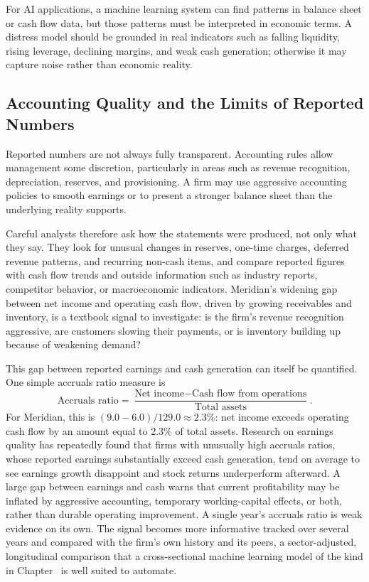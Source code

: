 \documentclass[../ai_in_finance]{subfiles}
\begin{document}
For AI applications, a machine learning system can find patterns in balance sheet or cash flow data, but those patterns must be interpreted in economic terms. A distress model should be grounded in real indicators such as falling liquidity, rising leverage, declining margins, and weak cash generation; otherwise it may capture noise rather than economic reality.

\subsection{Accounting Quality and the Limits of Reported Numbers}
\label{sec:accounting-quality}

Reported numbers are not always fully transparent. Accounting rules allow management some discretion, particularly in areas such as revenue recognition, depreciation, reserves, and provisioning. A firm may use aggressive accounting policies to smooth earnings or to present a stronger balance sheet than the underlying reality supports.

Careful analysts therefore ask how the statements were produced, not only what they say. They look for unusual changes in reserves, one-time charges, deferred revenue patterns, and recurring non-cash items, and compare reported figures with cash flow trends and outside information such as industry reports, competitor behavior, or macroeconomic indicators. Meridian's widening gap between net income and operating cash flow, driven by growing receivables and inventory, is a textbook signal to investigate: is the firm's revenue recognition aggressive, are customers slowing their payments, or is inventory building up because of weakening demand?

This gap between reported earnings and cash generation can itself be quantified. One simple accruals ratio measure is
\begin{equation*}
\text{Accruals ratio} = \frac{\text{Net income} - \text{Cash flow from operations}}{\text{Total assets}}.
\end{equation*}
For Meridian, this is $(9.0 - 6.0)/129.0 \approx 2.3\%$: net income exceeds operating cash flow by an amount equal to 2.3\% of total assets. Research on earnings quality has repeatedly found that firms with unusually high accruals ratios, whose reported earnings substantially exceed cash generation, tend on average to see earnings growth disappoint and stock returns underperform afterward. A large gap between earnings and cash warns that current profitability may be inflated by aggressive accounting, temporary working-capital effects, or both, rather than durable operating improvement.
A single year's accruals ratio is weak evidence on its own. The signal becomes more informative tracked over several years and compared with the firm's own history and its peers, a sector-adjusted, longitudinal comparison that a cross-sectional machine learning model of the kind in Chapter~ is well suited to automate.
\end{document}
